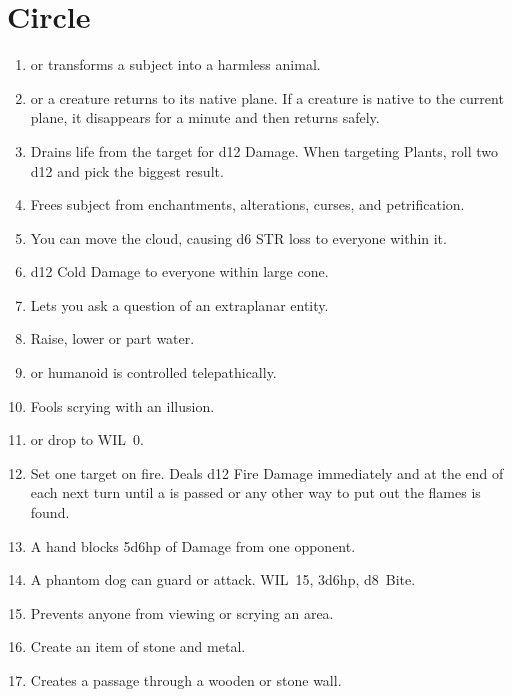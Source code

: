 \documentclass[itdr]{subfiles}
\begin{document}
\vfill
\break

\section{ Circle}
\begin{enumerate}
	\item {}  or transforms a subject into a harmless animal.
	\item {}  or a creature returns to its native plane. If a creature is native to the current plane, it disappears for a minute and then returns safely.
	\item {} Drains life from the target for d12 Damage. When targeting Plants, roll two d12 and pick the biggest result.
	\item {} Frees subject from enchantments, alterations, curses, and petrification.
	\item {} You can move the cloud, causing d6 STR loss to everyone within it.
	\item {} d12 Cold Damage to everyone within large cone.
	\item {} Lets you ask a question of an extraplanar entity.
	\item {} Raise, lower or part water.
	\item {}  or humanoid is controlled telepathically.
	\item {} Fools scrying with an illusion.
	\item {}  or drop to WIL~0.
	\item {} Set one target on fire. Deals d12 Fire Damage immediately and at the end of each next turn until a  is passed or any other way to put out the flames is found.
	\item {} A hand blocks 5d6hp of Damage from one opponent.
	\item {} A phantom dog can guard or attack. WIL~15, 3d6hp, d8~Bite.
	\item {} Prevents anyone from viewing or scrying an area.
	\item {} Create an item of stone and metal.
	\item {} Creates a passage through a wooden or stone wall.

\end{enumerate}
\end{document}
